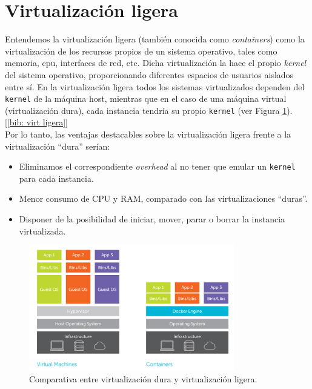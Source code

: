 \documentclass[a4paper, oneside, 12pt]{book}
\begin{document}
	\pagebreak
	
	\section{Virtualización ligera}
	\label{sect: virt ligera}
	
	\noindent Entendemos la virtualización ligera (también conocida como \textit{containers}) como la virtualización de los recursos propios de un sistema operativo, tales como memoria, cpu, interfaces de red, etc. Dicha virtualización la hace el propio \textit{kernel} del sistema operativo, proporcionando diferentes espacios de usuarios aislados entre sí. En la virtualización ligera todos los sistemas virtualizados dependen del \texttt{kernel} de la máquina host, mientras que en el caso de una máquina virtual (virtualización dura), cada instancia tendría su propio \texttt{kernel} (ver Figura \ref{img: virtualization comparative}). [\ref{bib: virt ligera}]\\
	
	\noindent Por lo tanto, las ventajas destacables sobre la virtualización ligera frente a la virtualización ``dura'' serían:
	\begin{itemize}
		\item Eliminamos el correspondiente \textit{overhead} al no tener que emular un \texttt{kernel} para cada instancia.
		\item Menor consumo de CPU y RAM, comparado con las virtualizaciones ``duras''.
		\item Disponer de la posibilidad de iniciar, mover, parar o borrar la instancia virtualizada.
	\end{itemize}
	
	\begin{figure}[h!]
		\begin{center}
			\includegraphics[width=0.8\textwidth]{img/virtualization_comparative_2.png}
			\caption{Comparativa entre virtualización dura y virtualización ligera.}
			\label{img: virtualization comparative}
		\end{center}
	\end{figure}
	
\end{document}
